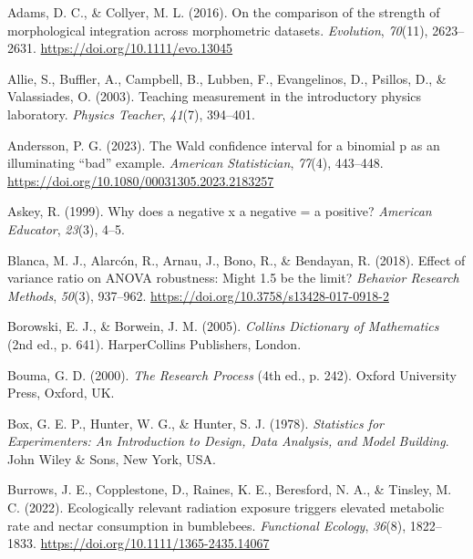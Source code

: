 \documentclass[
  openany]{krantz}
\newlength{\cslhangindent}
\newlength{\cslentryspacingunit} %
\newenvironment{CSLReferences}[2] %
 {%
  \setlength{\parindent}{0pt}
  \ifodd #1
  \let\oldpar\par
  \def\par{\hangindent=\cslhangindent\oldpar}
  \fi
  \setlength{\parskip}{#2\cslentryspacingunit}
 }%
 {}
\begin{document}
\hypertarget{refs}{}
\begin{CSLReferences}{1}{0}
\leavevmode{}%
Adams, D. C., \& Collyer, M. L. (2016). {On the comparison of the strength of morphological integration across morphometric datasets}. \emph{Evolution}, \emph{70}(11), 2623--2631. \url{https://doi.org/10.1111/evo.13045}

\leavevmode{}%
Allie, S., Buffler, A., Campbell, B., Lubben, F., Evangelinos, D., Psillos, D., \& Valassiades, O. (2003). Teaching measurement in the introductory physics laboratory. \emph{Physics Teacher}, \emph{41}(7), 394--401.

\leavevmode{}%
Andersson, P. G. (2023). The {W}ald confidence interval for a binomial p as an illuminating {``bad''} example. \emph{American Statistician}, \emph{77}(4), 443--448. \url{https://doi.org/10.1080/00031305.2023.2183257}

\leavevmode{}%
Askey, R. (1999). {Why does a negative x a negative = a positive?} \emph{American Educator}, \emph{23}(3), 4--5.

\leavevmode{}%
Blanca, M. J., Alarcón, R., Arnau, J., Bono, R., \& Bendayan, R. (2018). {Effect of variance ratio on ANOVA robustness: Might 1.5 be the limit?} \emph{Behavior Research Methods}, \emph{50}(3), 937--962. \url{https://doi.org/10.3758/s13428-017-0918-2}

\leavevmode{}%
Borowski, E. J., \& Borwein, J. M. (2005). \emph{{Collins Dictionary of Mathematics}} (2nd ed., p. 641). HarperCollins Publishers, London.

\leavevmode{}%
Bouma, G. D. (2000). \emph{{The Research Process}} (4th ed., p. 242). Oxford University Press, Oxford, UK.

\leavevmode{}%
Box, G. E. P., Hunter, W. G., \& Hunter, S. J. (1978). \emph{{Statistics for Experimenters: An Introduction to Design, Data Analysis, and Model Building}}. John Wiley \& Sons, New York, USA.

\leavevmode{}%
Burrows, J. E., Copplestone, D., Raines, K. E., Beresford, N. A., \& Tinsley, M. C. (2022). {Ecologically relevant radiation exposure triggers elevated metabolic rate and nectar consumption in bumblebees}. \emph{Functional Ecology}, \emph{36}(8), 1822--1833. \url{https://doi.org/10.1111/1365-2435.14067}


\end{CSLReferences}
\end{document}

